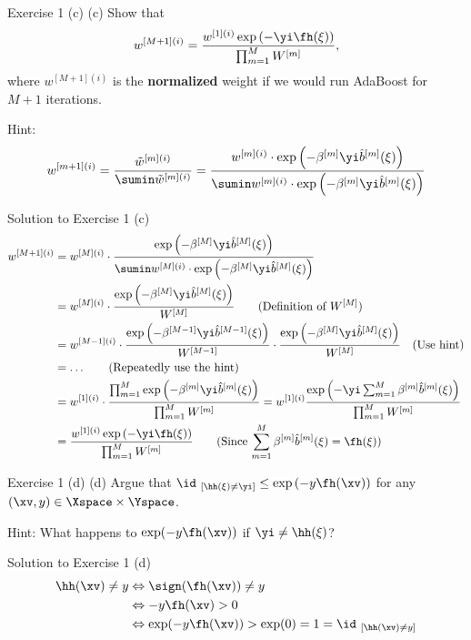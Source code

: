 \documentclass[aspectratio=169]{beamer}
\newcommand{\bhm}{\hat{b}^{[m]}}
\newcommand{\bhM}{\hat{b}^{[M]}}
\newcommand{\bhMmone}{\hat{b}^{[M-1]}}
\newcommand{\idhxneqy}{\id_{\ [\hh\left(\xi\right) \neq \yi]}}
\newcommand{\summM}{\sum_{m=1}^M}
\newcommand{\prodmM}{\prod_{m=1}^M}
\newcommand{\Wm}{W^{[m]}}
\newcommand{\WM}{W^{[M]}}
\newcommand{\wmi}{w^{[m] (i)}}
\newcommand{\wMi}{w^{[M] (i)}}
\newcommand{\wtmi}{\tilde{w}^{[m](i)}}
\newcommand{\wmponei}{w^{[m+1] (i)}}
\newcommand{\wMmonei}{w^{[M-1] (i)}}
\newcommand{\wMponei}{w^{[M + 1](i)}}
\newcommand{\wonei}{w^{[1] (i)}}
\newcommand{\betam}{\beta^{[m]}}
\newcommand{\betaM}{\beta^{[M]}}
\newcommand{\betaMmone}{\beta^{[M-1]}}
\begin{document}
\begin{frame}{Exercise 1 (c)}
	(c) Show that 
	\begin{align*}
		\wMponei = \frac{\wonei \exp \left( - \yi \fh(\xi) \right)}{\prodmM \Wm},
	\end{align*}
	where $\wMponei$ is the \textbf{normalized} weight if we would run AdaBoost for $M + 1$ iterations.
	
	Hint:
	\begin{align*}
		\wmponei = \frac{\wtmi}{\sumin \wtmi} = \frac{\wmi \cdot \exp \left(-\betam \yi \bhm (\xi) \right)}{\sumin \wmi \cdot \exp \left(-\betam \yi \bhm (\xi) \right)}
	\end{align*}
\end{frame}

\begin{frame}{Solution to Exercise 1 (c)}
	\small
	\begin{align*}
		\wMponei &= \wMi \cdot \frac{\exp \left(-\betaM \yi \bhM (\xi) \right)}{\sumin \wMi \cdot \exp \left(-\betaM \yi \bhM (\xi) \right)} \\
		&= \wMi \cdot \frac{\exp \left( - \betaM \yi \bhM (\xi)\right)}{\WM}  \qquad \text{(Definition of $\WM$)}\\
		&= \wMmonei \cdot \frac{\exp \left( - \betaMmone \yi \bhMmone (\xi) \right)}{W^{[M-1]}} \cdot \frac{\exp \left( - \betaM \yi \bhM (\xi)\right)}{\WM} \quad \text{(Use hint)} \\
		&= \ldots \qquad \text{(Repeatedly use the hint)}\\
		&= \wonei \cdot \frac{\prodmM \exp \left( - \betam \yi \bhm (\xi) \right)}{\prodmM \Wm} = \wonei \frac{\exp \left( - \yi \summM \betam \bhm (\xi) \right)}{\prodmM \Wm} \\
		&= \frac{\wonei \exp \left( - \yi \fh(\xi) \right)}{\prodmM \Wm}  \qquad \text{(Since $\summM \betam \bhm (\xi) = \fh(\xi)$)}
	\end{align*}
\end{frame}

\begin{frame}{Exercise 1 (d)}
	(d) Argue that $\idhxneqy \leq \exp \left( -y \fh(\xv) \right)$ for any $(\xv, y) \in \Xspace \times \Yspace$.
	
	Hint: 
	What happens to $\exp(-y \fh(\xv))$ if $\yi \neq \hh(\xi)$?
\end{frame}

\begin{frame}{Solution to Exercise 1 (d)}
	\begin{align*}
		\hh(\xv) \neq y &\Leftrightarrow \sign(\fh(\xv)) \neq y \\
		&\Leftrightarrow -y\fh(\xv) > 0 \\
		&\Leftrightarrow \exp(-y\fh(\xv)) > \exp(0) = 1 = \id_{\ [\hh(\xv) \neq y]}
	\end{align*}
\end{frame}
\end{document}
